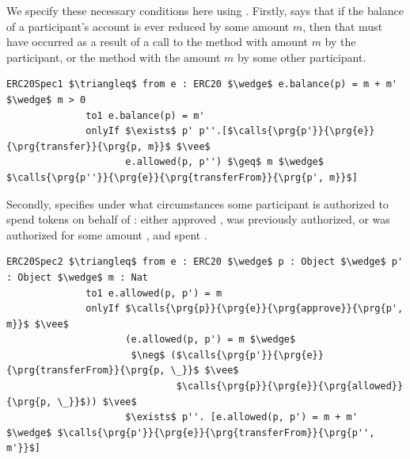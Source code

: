 We specify these necessary conditions here using \Chainmail{}. Firstly,  
says that if the balance of a participant's account is ever reduced by some amount $m$, then
that must have occurred as a result of a call to the  method with amount $m$ by the participant,
or the  method with the amount $m$ by some other participant.
\begin{lstlisting}[language = Chainmail, mathescape=true, frame=lines]
ERC20Spec1 $\triangleq$ from e : ERC20 $\wedge$ e.balance(p) = m + m' $\wedge$ m > 0
              to1 e.balance(p) = m'
              onlyIf $\exists$ p' p''.[$\calls{\prg{p'}}{\prg{e}}{\prg{transfer}}{\prg{p, m}}$ $\vee$ 
                     e.allowed(p, p'') $\geq$ m $\wedge$ $\calls{\prg{p''}}{\prg{e}}{\prg{transferFrom}}{\prg{p', m}}$]
\end{lstlisting}
Secondly,  specifies under what circumstances some participant  is authorized to 
spend  tokens on behalf of : either  approved ,  was previously authorized,
or  was authorized for some amount , and spent .
\begin{lstlisting}[language = Chainmail, mathescape=true, frame=lines]
ERC20Spec2 $\triangleq$ from e : ERC20 $\wedge$ p : Object $\wedge$ p' : Object $\wedge$ m : Nat
              to1 e.allowed(p, p') = m
              onlyIf $\calls{\prg{p}}{\prg{e}}{\prg{approve}}{\prg{p', m}}$ $\vee$ 
                     (e.allowed(p, p') = m $\wedge$ 
                      $\neg$ ($\calls{\prg{p'}}{\prg{e}}{\prg{transferFrom}}{\prg{p, \_}}$ $\vee$ 
                              $\calls{\prg{p}}{\prg{e}}{\prg{allowed}}{\prg{p, \_}}$)) $\vee$
                     $\exists$ p''. [e.allowed(p, p') = m + m' $\wedge$ $\calls{\prg{p'}}{\prg{e}}{\prg{transferFrom}}{\prg{p'', m'}}$]
\end{lstlisting}

